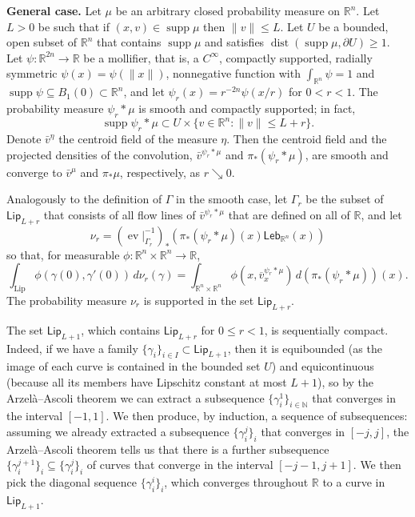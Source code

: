 \documentclass[11pt]{article}
\theoremstyle{definition}
\theoremstyle{remark}
\DeclareMathOperator{\supp}{supp}
\DeclareMathOperator{\dist}{dist}
\DeclareMathOperator{\lip}{Lip}
\newcommand{\R}{\mathbb{R}}
\newcommand{\N}{\mathbb{N}}
\newcommand{\lebesgue}{\mathsf{Leb}}
\newcommand{\lipschitz}{\mathsf{Lip}}
\renewcommand{\geq}{\geqslant}
\renewcommand{\leq}{\leqslant}
\begin{document}
\smallskip
\noindent
\textbf{General case.}
Let $\mu$ be an arbitrary closed probability measure on $\R^n$. Let $L>0$ be such that if $(x,v)\in\supp\mu$ then $\|v\|\leq L$. Let $U$ be a bounded, open subset of $\R^n$ that contains $\supp\mu$ and satisfies $\dist(\supp\mu,\partial U)\geq 1$.
Let $\psi\colon\R^{2n}\to\R$ be a mollifier, that is, a $C^\infty$, compactly supported, radially
symmetric $\psi(x)=\psi(\|x\|)$, nonnegative function with $\int_{\R^n}\psi=1$ and $\supp\psi\subseteq B_1(0)\subset\R^n$, and let $\psi_r(x)=r^{-2n}\psi(x/r)$ for $0<r<1$. 
The probability measure $\psi_r*\mu$ is smooth and compactly supported; in fact,
\[\supp\psi_r*\mu\subset U\times\{v\in\R^n:\|v\|\leq L+r\}.\]
Denote $\bar v^\eta$ the centroid field of the measure $\eta$. Then the centroid field and the projected densities of the convolution, $\bar v^{\psi_r*\mu}$ and $\pi_*(\psi_r*\mu)$, are smooth and converge to $\bar v^\mu$ and $\pi_*\mu$, respectively, as $r\searrow 0$.

Analogously to the definition of $\Gamma$ in the smooth case, let $\Gamma_r$ be the subset of $\lipschitz_{L+r}$ that consists of all flow lines of $\bar v^{\psi_r*\mu}$ that are defined on all of $\R$, and let
\[\nu_r=(\operatorname{ev}|_{\Gamma_r}^{-1})_*( \pi_*(\psi_r*\mu)(x)\lebesgue_{\R^n}(x))\]
so that, for measurable $\phi\colon\R^n\times\R^n\to\R$,
\[\int_{\lip}\phi(\gamma(0),\gamma'(0))\,d\nu_r(\gamma)=\int_{\R^n\times\R^n}\phi(x,\overline v_x^{\psi_r*\mu})\,d(\pi_*(\psi_r*\mu))(x).\]
The probability measure $\nu_r$ is supported in the set $\lipschitz_{L+r}$. 

The set $\lipschitz_{L+1}$, which contains $\lipschitz_{L+r}$ for $0\leq r<1$, is sequentially compact. Indeed, if we have a family $\{\gamma_i\}_{i\in I}\subset \lipschitz_{L+1}$, then it is equibounded (as the image of each curve is contained in the bounded set $U$) and equicontinuous (because all its members have Lipschitz constant at most $L+1$), so by the Arzel\`a--Ascoli theorem we can extract a subsequence $\{\gamma_i^1\}_{i\in \N}$ that converges in the interval $[-1,1]$. We then produce, by induction, a sequence of subsequences: assuming we already extracted a subsequence $\{\gamma^j_i\}_i$ that converges in $[-j,j]$, the Arzel\`a--Ascoli theorem tells us that there is a further subsequence $\{\gamma^{j+1}_i\}_i\subseteq \{\gamma^j_i\}_i$ of curves that converge in the interval $[-j-1,j+1]$. We then pick the diagonal sequence $\{\gamma^i_i\}_i$, which converges throughout $\R$ to a curve in $\lipschitz_{L+1}$.
\end{document}

